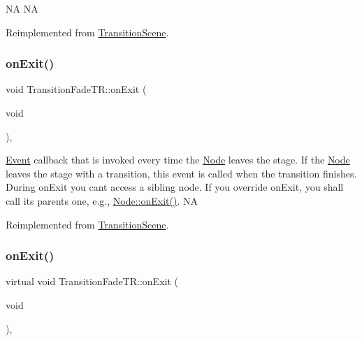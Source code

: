 NA  NA 

Reimplemented from \hyperlink{classTransitionScene_aace390a1bd8f3c73bb650a1e256a0f83}{Transition\+Scene}.

\mbox{\label{classTransitionFadeTR_a62a984bd87eb2090da0e542e5ce91cce}} 
\subsubsection{\texorpdfstring{on\+Exit()}{onExit()}\hspace{0.1cm}{\footnotesize\ttfamily [1/2]}}
{\footnotesize\ttfamily void Transition\+Fade\+T\+R\+::on\+Exit (\begin{DoxyParamCaption}\item[{void}]{ }\end{DoxyParamCaption})\hspace{0.3cm}{\ttfamily [override]}, {\ttfamily [virtual]}}

\hyperlink{classEvent}{Event} callback that is invoked every time the \hyperlink{classNode}{Node} leaves the \textquotesingle{}stage\textquotesingle{}. If the \hyperlink{classNode}{Node} leaves the \textquotesingle{}stage\textquotesingle{} with a transition, this event is called when the transition finishes. During on\+Exit you can\textquotesingle{}t access a sibling node. If you override on\+Exit, you shall call its parent\textquotesingle{}s one, e.\+g., \hyperlink{classNode_ac83de835ea315e3179d4293acd8903ac}{Node\+::on\+Exit()}.  NA 

Reimplemented from \hyperlink{classTransitionScene_a45e39b658189c79428a05c3bc3173bbb}{Transition\+Scene}.

\mbox{\label{classTransitionFadeTR_a9460b2272ddd276f68727429474b6862}} 
\subsubsection{\texorpdfstring{on\+Exit()}{onExit()}\hspace{0.1cm}{\footnotesize\ttfamily [2/2]}}
{\footnotesize\ttfamily virtual void Transition\+Fade\+T\+R\+::on\+Exit (\begin{DoxyParamCaption}\item[{void}]{ }\end{DoxyParamCaption})\hspace{0.3cm}{\ttfamily [override]}, {\ttfamily [virtual]}}

